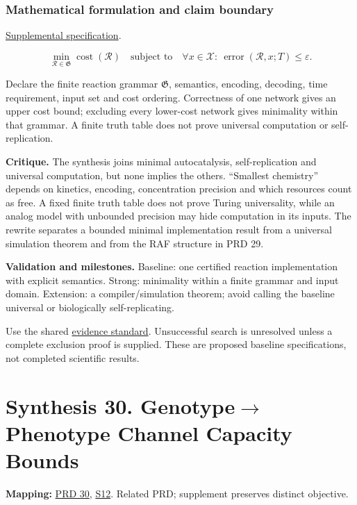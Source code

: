 \documentclass[
  11pt,
]{article}
\newcounter{none} %
\begin{document}
\subsubsection{Mathematical formulation and claim boundary}

\href{https://github.com/rick-stevens-ai/Pure-Thought/blob/main/supplemental/S11.md}{Supplemental
specification}.

\[\min_{\mathcal R\in\mathfrak G}\operatorname{cost}(\mathcal R)
\quad\text{subject to}\quad
\forall x\in\mathcal X:\ \operatorname{error}(\mathcal R,x;T)\le\varepsilon.\]

Declare the finite reaction grammar \(\mathfrak G\), semantics,
encoding, decoding, time requirement, input set and cost ordering.
Correctness of one network gives an upper cost bound; excluding every
lower-cost network gives minimality within that grammar. A finite truth
table does not prove universal computation or self-replication.

\textbf{Critique.} The synthesis joins minimal autocatalysis,
self-replication and universal computation, but none implies the others.
``Smallest chemistry'' depends on kinetics, encoding, concentration
precision and which resources count as free. A fixed finite truth table
does not prove Turing universality, while an analog model with unbounded
precision may hide computation in its inputs. The rewrite separates a
bounded minimal implementation result from a universal simulation
theorem and from the RAF structure in PRD 29.

\textbf{Validation and milestones.} Baseline: one certified reaction
implementation with explicit semantics. Strong: minimality within a
finite grammar and input domain. Extension: a compiler/simulation
theorem; avoid calling the baseline universal or biologically
self-replicating.

Use the shared
\href{https://github.com/rick-stevens-ai/Pure-Thought/blob/main/reviews/EVIDENCE-STANDARD.md}{evidence
standard}. Unsuccessful search is unresolved unless a complete exclusion
proof is supplied. These are proposed baseline specifications, not
completed scientific results.

\section{\texorpdfstring{Synthesis 30. Genotype\ensuremath{\to}Phenotype
Channel Capacity Bounds}{Synthesis 30.  Channel Capacity Bounds}}

\textbf{Mapping:}
\href{https://github.com/rick-stevens-ai/Pure-Thought/blob/main/PRDs/30-Genotype-Phenotype-Mapping.md}{PRD
30},
\href{https://github.com/rick-stevens-ai/Pure-Thought/blob/main/supplemental/S12.md}{S12}.
Related PRD; supplement preserves distinct objective.
\end{document}

